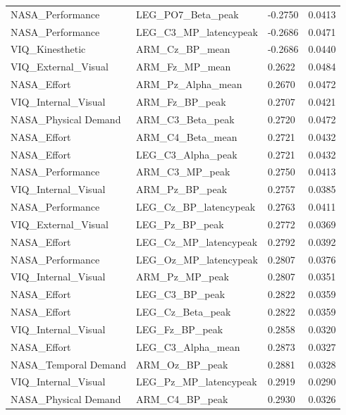 \documentclass[10pt,letterpaper]{article}
\begin{document}
\begin{longtable}{@{}llll@{}}
NASA\_Performance & LEG\_PO7\_Beta\_peak & -0.2750 & 0.0413 \\
NASA\_Performance & LEG\_C3\_MP\_latencypeak & -0.2686 & 0.0471 \\
\rowcolor[HTML]{EFEFEF} 
VIQ\_Kinesthetic & ARM\_Cz\_BP\_mean & -0.2686 & 0.0440 \\
VIQ\_External\_Visual & ARM\_Fz\_MP\_mean & 0.2622 & 0.0484 \\
\rowcolor[HTML]{EFEFEF} 
NASA\_Effort & ARM\_Pz\_Alpha\_mean & 0.2670 & 0.0472 \\
VIQ\_Internal\_Visual & ARM\_Fz\_BP\_peak & 0.2707 & 0.0421 \\
\rowcolor[HTML]{EFEFEF} 
NASA\_Physical Demand & ARM\_C3\_Beta\_peak & 0.2720 & 0.0472 \\
NASA\_Effort & ARM\_C4\_Beta\_mean & 0.2721 & 0.0432 \\
\rowcolor[HTML]{EFEFEF} 
NASA\_Effort & LEG\_C3\_Alpha\_peak & 0.2721 & 0.0432 \\
NASA\_Performance & ARM\_C3\_MP\_peak & 0.2750 & 0.0413 \\
\rowcolor[HTML]{EFEFEF} 
VIQ\_Internal\_Visual & ARM\_Pz\_BP\_peak & 0.2757 & 0.0385 \\
NASA\_Performance & LEG\_Cz\_BP\_latencypeak & 0.2763 & 0.0411 \\
\rowcolor[HTML]{EFEFEF} 
VIQ\_External\_Visual & LEG\_Pz\_BP\_peak & 0.2772 & 0.0369 \\
NASA\_Effort & LEG\_Cz\_MP\_latencypeak & 0.2792 & 0.0392 \\
\rowcolor[HTML]{EFEFEF} 
NASA\_Performance & LEG\_Oz\_MP\_latencypeak & 0.2807 & 0.0376 \\
VIQ\_Internal\_Visual & ARM\_Pz\_MP\_peak & 0.2807 & 0.0351 \\
\rowcolor[HTML]{EFEFEF} 
NASA\_Effort & LEG\_C3\_BP\_peak & 0.2822 & 0.0359 \\
NASA\_Effort & LEG\_Cz\_Beta\_peak & 0.2822 & 0.0359 \\
\rowcolor[HTML]{EFEFEF} 
VIQ\_Internal\_Visual & LEG\_Fz\_BP\_peak & 0.2858 & 0.0320 \\
NASA\_Effort & LEG\_C3\_Alpha\_mean & 0.2873 & 0.0327 \\
\rowcolor[HTML]{EFEFEF} 
NASA\_Temporal Demand & ARM\_Oz\_BP\_peak & 0.2881 & 0.0328 \\
VIQ\_Internal\_Visual & LEG\_Pz\_MP\_latencypeak & 0.2919 & 0.0290 \\
\rowcolor[HTML]{EFEFEF} 
NASA\_Physical Demand & ARM\_C4\_BP\_peak & 0.2930 & 0.0326 \\

\end{longtable}
\end{document}
